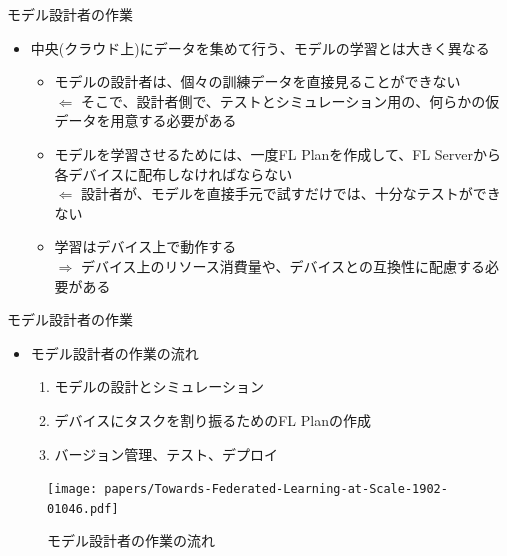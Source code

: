 \documentclass[dvipdfmx,notheorems,t]{beamer}
\begin{document}
\begin{frame}{モデル設計者の作業}

\begin{itemize}
	\item 中央(クラウド上)にデータを集めて行う、モデルの学習とは大きく異なる
	\begin{itemize}
		\item モデルの設計者は、個々の訓練データを直接見ることができない \\
		$\Leftarrow$ そこで、設計者側で、テストとシミュレーション用の、何らかの仮データを用意する必要がある
		\newline
		
		\item モデルを学習させるためには、一度FL Planを作成して、FL Serverから各デバイスに配布しなければならない \\
		$\Leftarrow$ 設計者が、モデルを直接手元で試すだけでは、十分なテストができない
		\newline
		
		\item 学習はデバイス上で動作する \\
		$\Rightarrow$ デバイス上のリソース消費量や、デバイスとの互換性に配慮する必要がある
	\end{itemize}
\end{itemize}

\end{frame}

\begin{frame}{モデル設計者の作業}

\begin{itemize}
	\item モデル設計者の作業の流れ
	\begin{enumerate}
		\item モデルの設計とシミュレーション
		\item デバイスにタスクを割り振るためのFL Planの作成
		\item バージョン管理、テスト、デプロイ
	\end{enumerate}
\end{itemize}

\begin{figure}
	\centering
	\texttt{[image: papers/Towards-Federated-Learning-at-Scale-1902-01046.pdf]}
	\caption{モデル設計者の作業の流れ~\cite{DBLP:journals/corr/abs-1902-01046}}
	\label{fig:model-engineer-workflow}
\end{figure}

\end{frame}
\end{document}
